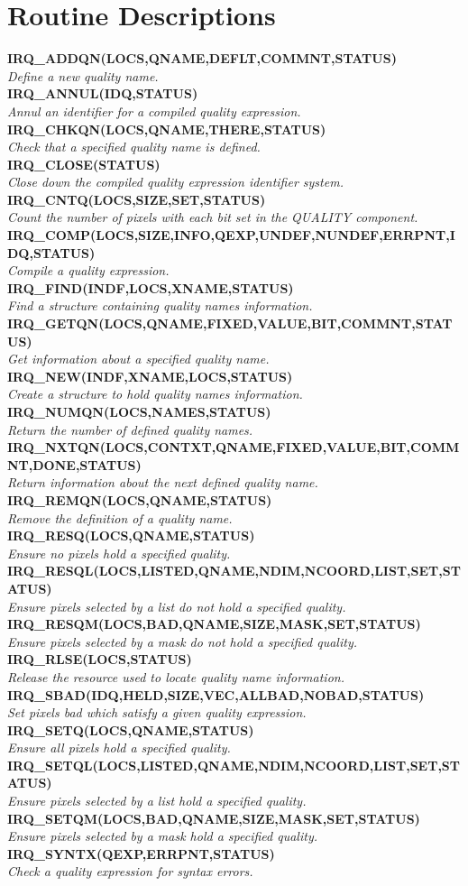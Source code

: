 \appendix
\section {Routine Descriptions}

\newcommand{\noteroutine}[2]{{\small \bf #1} \\
                              \hspace*{3em} {\em #2} \\[1.5ex]}

\noteroutine{IRQ\_ADDQN(LOCS,QNAME,DEFLT,COMMNT,STATUS)}
   {Define a new quality name.}
\noteroutine{IRQ\_ANNUL(IDQ,STATUS)}
   {Annul an identifier for a compiled quality expression.}
\noteroutine{IRQ\_CHKQN(LOCS,QNAME,THERE,STATUS)}
   {Check that a specified quality name is defined.}
\noteroutine{IRQ\_CLOSE(STATUS)}
   {Close down the compiled quality expression identifier system.}
\noteroutine{IRQ\_CNTQ(LOCS,SIZE,SET,STATUS)}
   {Count the number of pixels with each bit set in the QUALITY component.}
\noteroutine{IRQ\_COMP(LOCS,SIZE,INFO,QEXP,UNDEF,NUNDEF,ERRPNT,IDQ,STATUS)}
   {Compile a quality expression.}
\noteroutine{IRQ\_FIND(INDF,LOCS,XNAME,STATUS)}
   {Find a structure containing quality names information.}
\noteroutine{IRQ\_GETQN(LOCS,QNAME,FIXED,VALUE,BIT,COMMNT,STATUS)}
   {Get information about a specified quality name.}
\noteroutine{IRQ\_NEW(INDF,XNAME,LOCS,STATUS)}
   {Create a structure to hold quality names information.}
\noteroutine{IRQ\_NUMQN(LOCS,NAMES,STATUS)}
   {Return the number of defined quality names.}
\noteroutine{IRQ\_NXTQN(LOCS,CONTXT,QNAME,FIXED,VALUE,BIT,COMMNT,DONE,STATUS)}
   {Return information about the next defined quality name.}
\noteroutine{IRQ\_REMQN(LOCS,QNAME,STATUS)}
   {Remove the definition of a quality name.}
\noteroutine{IRQ\_RESQ(LOCS,QNAME,STATUS)}
   {Ensure no pixels hold a specified quality.}
\noteroutine{IRQ\_RESQL(LOCS,LISTED,QNAME,NDIM,NCOORD,LIST,SET,STATUS)}
   {Ensure pixels selected by a list do not hold a specified quality.}
\noteroutine{IRQ\_RESQM(LOCS,BAD,QNAME,SIZE,MASK,SET,STATUS)}
   {Ensure pixels selected by a mask do not hold a specified quality.}
\noteroutine{IRQ\_RLSE(LOCS,STATUS)}
   {Release the resource used to locate quality name information.}
\noteroutine{IRQ\_SBAD(IDQ,HELD,SIZE,VEC,ALLBAD,NOBAD,STATUS)}
   {Set pixels bad which satisfy a given quality expression.}
\noteroutine{IRQ\_SETQ(LOCS,QNAME,STATUS)}
   {Ensure all pixels hold a specified quality.}
\noteroutine{IRQ\_SETQL(LOCS,LISTED,QNAME,NDIM,NCOORD,LIST,SET,STATUS)}
   {Ensure pixels selected by a list hold a specified quality.}
\noteroutine{IRQ\_SETQM(LOCS,BAD,QNAME,SIZE,MASK,SET,STATUS)}
   {Ensure pixels selected by a mask hold a specified quality.}
\noteroutine{IRQ\_SYNTX(QEXP,ERRPNT,STATUS)}
   {Check a quality expression for syntax errors.}

